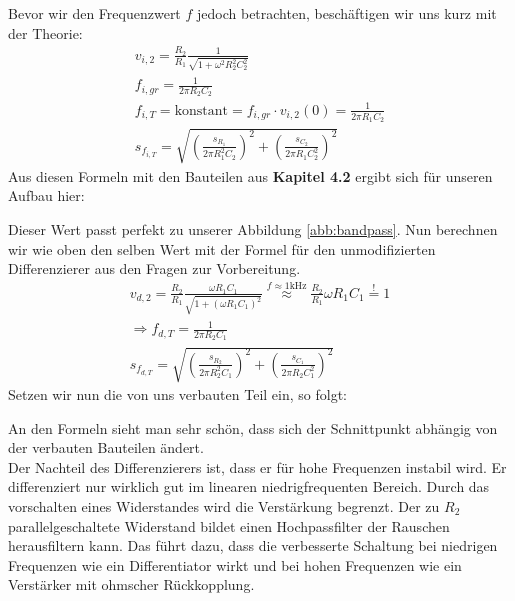 Bevor wir den Frequenzwert $f$ jedoch betrachten, beschäftigen wir uns kurz mit der Theorie:\newline
\begin{gather}
    v_{i,2} = \frac{R_2}{R_1}\frac{1}{\sqrt{1+\omega ^2 R_{2}^2C_{2}^2}}\\
    f_{i,gr} = \frac{1}{2 \pi R_2 C_2}\\
    f_{i,T} = \text{konstant} = f_{i,gr} \cdot v_{i,2}(0) = \frac{1}{2\pi R_1 C_2 }\\
    s_{f_{i,T}} = \sqrt{(\frac{s_{R_1}}{2 \pi R_{1}^2 C_2})^2+ (\frac{s_{C_2}}{2 \pi R_{1} C_{2}^2})^2}
\end{gather}
Aus diesen Formeln mit den Bauteilen aus \textbf{Kapitel 4.2} ergibt sich für unseren Aufbau hier:
\begin{center}
\end{center}
Dieser Wert passt perfekt zu unserer Abbildung \ref{abb:bandpass}.
Nun berechnen wir wie oben den selben Wert mit der Formel für den unmodifizierten Differenzierer aus den Fragen zur Vorbereitung.
\begin{gather}
    v_{d,2} = \frac{R_2}{R_1} \frac{\omega R_1C_1}{\sqrt{1 + (\omega R_1C_1)^2}} \overset{f \approx 1 \text{kHz}}{\approx} \frac{R_2}{R_1} \omega R_1C_1  \overset{!}{=} 1\\
    \Rightarrow f_{d,T} = \frac{1}{2 \pi R_2 C_1}\\
    s_{f_{d,T}} = \sqrt{(\frac{s_{R_2}}{2 \pi R_{2}^2 C_1})^2+ (\frac{s_{C_1}}{2 \pi R_{2} C_{1}^2})^2}
\end{gather}
Setzen wir nun die von uns verbauten Teil ein, so folgt:
\begin{center}
\end{center}
An den Formeln sieht man sehr schön, dass sich der Schnittpunkt abhängig von der verbauten 
Bauteilen ändert.\\
Der Nachteil des Differenzierers ist, dass er für hohe Frequenzen instabil wird. Er differenziert nur 
wirklich gut im linearen niedrigfrequenten Bereich. Durch das vorschalten eines Widerstandes wird die Verstärkung begrenzt. 
Der zu $R_2$ parallelgeschaltete Widerstand bildet einen Hochpassfilter der Rauschen herausfiltern kann. 
Das führt dazu, dass die verbesserte Schaltung bei niedrigen Frequenzen wie ein Differentiator wirkt und bei hohen 
Frequenzen wie ein Verstärker mit ohmscher Rückkopplung.\footnotemark
{}
